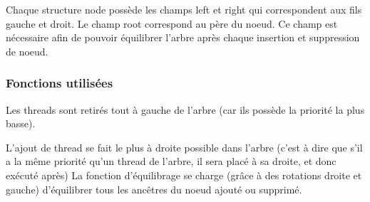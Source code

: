 Chaque structure node possède les champs left et right qui correspondent aux fils gauche et droit.
Le champ root correspond au père du noeud. Ce champ est nécessaire afin de pouvoir équilibrer l'arbre après chaque insertion et suppression de noeud.

\subsubsection{Fonctions utilisées}
Les threads sont retirés tout à gauche de l'arbre (car ils possède la priorité la plus basse).

L'ajout de thread se fait le plus à droite possible dans l'arbre (c'est à dire que s'il a la même priorité qu'un thread de l'arbre, il sera placé à sa droite, et donc exécuté après)
La fonction d'équilibrage se charge (grâce à des rotations droite et gauche) d'équilibrer tous les ancêtres du noeud ajouté ou supprimé.
